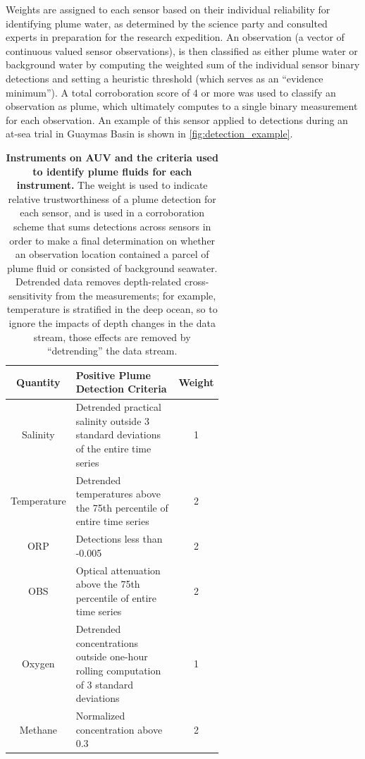Weights are assigned to each sensor based on their individual reliability for identifying plume water, as determined by the science party and consulted experts in preparation for the research expedition. An observation (a vector of continuous valued sensor observations), is then classified as either plume water or background water by computing the weighted sum of the individual sensor binary detections and setting a heuristic threshold (which serves as an ``evidence minimum''). A total corroboration score of 4 or more was used to classify an observation as plume, which ultimately computes to a single binary measurement for each observation. An example of this sensor applied to \Sentry detections during an at-sea trial in Guaymas Basin is shown in \cref{fig:detection_example}.

\begin{table}[h!]
    \centering
    \begin{tabular}{c|p{0.6\linewidth}|c}
        Quantity & Positive Plume Detection Criteria & Weight  \\
        \hline
        Salinity & Detrended practical salinity outside 3 standard deviations of the entire time series & 1 \\
        Temperature & Detrended temperatures above the 75th percentile of entire time series & 2 \\
        ORP & Detections less than -0.005 & 2 \\
        OBS & Optical attenuation above the 75th percentile of entire time series & 2 \\
        Oxygen & Detrended concentrations outside one-hour rolling computation of 3 standard deviations & 1 \\
        Methane & Normalized concentration above 0.3 & 2
    \end{tabular}
    \caption[Instruments on AUV \Sentry and the criteria used to identify plume fluids for each instrument.]{\textbf{Instruments on AUV \Sentry and the criteria used to identify plume fluids for each instrument.} The weight is used to indicate relative trustworthiness of a plume detection for each sensor, and is used in a corroboration scheme that sums detections across sensors in order to make a final determination on whether an observation location contained a parcel of plume fluid or consisted of background seawater. Detrended data removes depth-related cross-sensitivity from the measurements; for example, temperature is stratified in the deep ocean, so to ignore the impacts of depth changes in the data stream, those effects are removed by ``detrending'' the data stream.}
    \label{tab:sentry_instruments}
\end{table}

